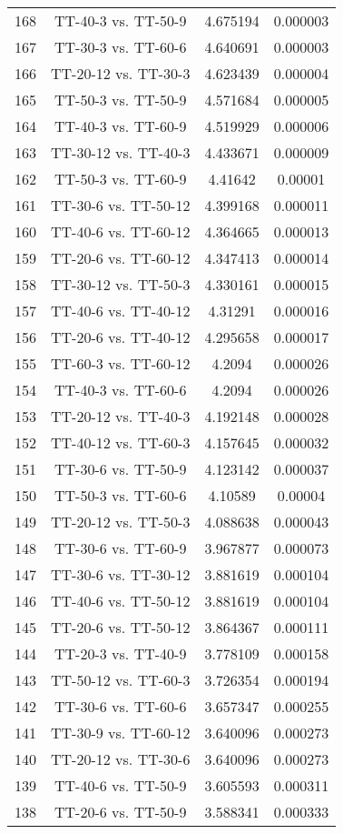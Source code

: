 \documentclass[a4paper,10pt]{article}
\begin{document}
\begin{landscape}
\begin{table}[!htp]
\begin{tabular}{cccc}
168&TT-40-3 vs. TT-50-9&4.675194&0.000003\\
167&TT-30-3 vs. TT-60-6&4.640691&0.000003\\
166&TT-20-12 vs. TT-30-3&4.623439&0.000004\\
165&TT-50-3 vs. TT-50-9&4.571684&0.000005\\
164&TT-40-3 vs. TT-60-9&4.519929&0.000006\\
163&TT-30-12 vs. TT-40-3&4.433671&0.000009\\
162&TT-50-3 vs. TT-60-9&4.41642&0.00001\\
161&TT-30-6 vs. TT-50-12&4.399168&0.000011\\
160&TT-40-6 vs. TT-60-12&4.364665&0.000013\\
159&TT-20-6 vs. TT-60-12&4.347413&0.000014\\
158&TT-30-12 vs. TT-50-3&4.330161&0.000015\\
157&TT-40-6 vs. TT-40-12&4.31291&0.000016\\
156&TT-20-6 vs. TT-40-12&4.295658&0.000017\\
155&TT-60-3 vs. TT-60-12&4.2094&0.000026\\
154&TT-40-3 vs. TT-60-6&4.2094&0.000026\\
153&TT-20-12 vs. TT-40-3&4.192148&0.000028\\
152&TT-40-12 vs. TT-60-3&4.157645&0.000032\\
151&TT-30-6 vs. TT-50-9&4.123142&0.000037\\
150&TT-50-3 vs. TT-60-6&4.10589&0.00004\\
149&TT-20-12 vs. TT-50-3&4.088638&0.000043\\
148&TT-30-6 vs. TT-60-9&3.967877&0.000073\\
147&TT-30-6 vs. TT-30-12&3.881619&0.000104\\
146&TT-40-6 vs. TT-50-12&3.881619&0.000104\\
145&TT-20-6 vs. TT-50-12&3.864367&0.000111\\
144&TT-20-3 vs. TT-40-9&3.778109&0.000158\\
143&TT-50-12 vs. TT-60-3&3.726354&0.000194\\
142&TT-30-6 vs. TT-60-6&3.657347&0.000255\\
141&TT-30-9 vs. TT-60-12&3.640096&0.000273\\
140&TT-20-12 vs. TT-30-6&3.640096&0.000273\\
139&TT-40-6 vs. TT-50-9&3.605593&0.000311\\
138&TT-20-6 vs. TT-50-9&3.588341&0.000333\\

\end{tabular}
\end{table}
\end{landscape}
\end{document}
